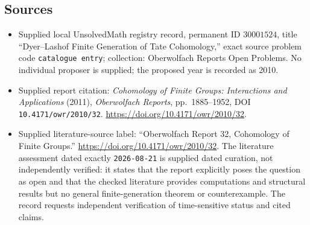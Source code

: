 \documentclass[11pt]{article}
\begin{document}
\subsection{Sources}
\begin{itemize}
\item Supplied local UnsolvedMath registry record, permanent ID \(30001524\), title ``Dyer--Lashof Finite Generation of Tate Cohomology,'' exact source problem code \texttt{catalogue entry}; collection: Oberwolfach Reports Open Problems. No individual proposer is supplied; the proposed year is recorded as 2010.
\item Supplied report citation: \emph{Cohomology of Finite Groups: Interactions and Applications} (2011), \emph{Oberwolfach Reports}, pp.~1885--1952, DOI \texttt{10.4171/owr/2010/32}. \url{https://doi.org/10.4171/owr/2010/32}.
\item Supplied literature-source label: ``Oberwolfach Report 32, Cohomology of Finite Groups.'' \url{https://doi.org/10.4171/owr/2010/32}. The literature assessment dated exactly \texttt{2026-08-21} is supplied dated curation, not independently verified: it states that the report explicitly poses the question as open and that the checked literature provides computations and structural results but no general finite-generation theorem or counterexample. The record requests independent verification of time-sensitive status and cited claims.
\end{itemize}
\end{document}
